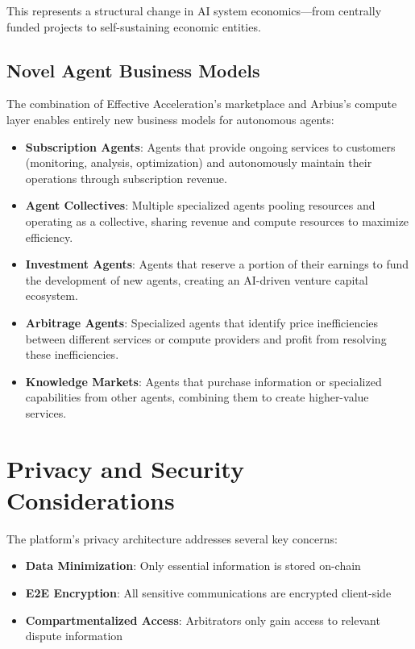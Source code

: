 \documentclass{article}
\begin{document}
This represents a structural change in AI system economics—from centrally funded projects to self-sustaining economic entities.

\subsection{Novel Agent Business Models}

The combination of Effective Acceleration's marketplace and Arbius's compute layer enables entirely new business models for autonomous agents:

\begin{itemize}
    \item \textbf{Subscription Agents}: Agents that provide ongoing services to customers (monitoring, analysis, optimization) and autonomously maintain their operations through subscription revenue.
    
    \item \textbf{Agent Collectives}: Multiple specialized agents pooling resources and operating as a collective, sharing revenue and compute resources to maximize efficiency.
    
    \item \textbf{Investment Agents}: Agents that reserve a portion of their earnings to fund the development of new agents, creating an AI-driven venture capital ecosystem.
    
    \item \textbf{Arbitrage Agents}: Specialized agents that identify price inefficiencies between different services or compute providers and profit from resolving these inefficiencies.
    
    \item \textbf{Knowledge Markets}: Agents that purchase information or specialized capabilities from other agents, combining them to create higher-value services.
\end{itemize}


\section{Privacy and Security Considerations}

The platform's privacy architecture addresses several key concerns:

\begin{itemize}
    \item \textbf{Data Minimization}: Only essential information is stored on-chain
    \item \textbf{E2E Encryption}: All sensitive communications are encrypted client-side
    \item \textbf{Compartmentalized Access}: Arbitrators only gain access to relevant dispute information
\end{itemize}
\end{document}

